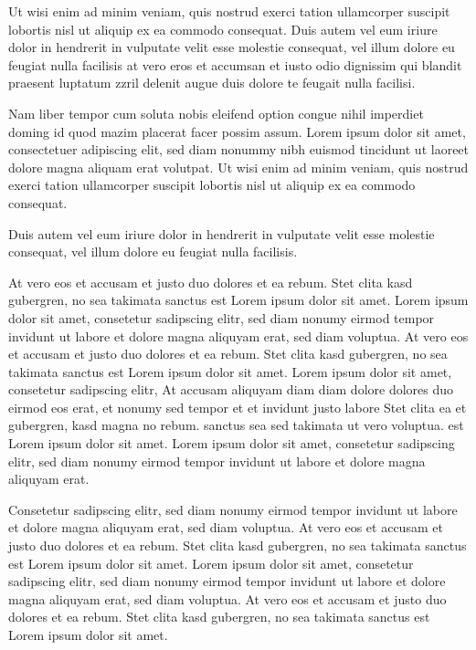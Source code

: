 \documentclass[a4paper]{article}
\begin{document}
Ut wisi enim ad minim veniam, quis nostrud exerci tation ullamcorper suscipit
lobortis nisl ut aliquip ex ea commodo consequat. Duis autem vel eum iriure
dolor in hendrerit in vulputate velit esse molestie consequat, vel illum dolore
eu feugiat nulla facilisis at vero eros et accumsan et iusto odio dignissim qui
blandit praesent luptatum zzril delenit augue duis dolore te feugait nulla
facilisi.

Nam liber tempor cum soluta nobis eleifend option congue nihil imperdiet doming
id quod mazim placerat facer possim assum. Lorem ipsum dolor sit amet,
consectetuer adipiscing elit, sed diam nonummy nibh euismod tincidunt ut
laoreet dolore magna aliquam erat volutpat. Ut wisi enim ad minim veniam, quis
nostrud exerci tation ullamcorper suscipit lobortis nisl ut aliquip ex ea
commodo consequat.

Duis autem vel eum iriure dolor in hendrerit in vulputate velit esse molestie
consequat, vel illum dolore eu feugiat nulla facilisis.

At vero eos et accusam et justo duo dolores et ea rebum. Stet clita kasd
gubergren, no sea takimata sanctus est Lorem ipsum dolor sit amet. Lorem ipsum
dolor sit amet, consetetur sadipscing elitr, sed diam nonumy eirmod tempor
invidunt ut labore et dolore magna aliquyam erat, sed diam voluptua. At vero
eos et accusam et justo duo dolores et ea rebum. Stet clita kasd gubergren, no
sea takimata sanctus est Lorem ipsum dolor sit amet. Lorem ipsum dolor sit amet,
consetetur sadipscing elitr, At accusam aliquyam diam diam dolore dolores duo
eirmod eos erat, et nonumy sed tempor et et invidunt justo labore Stet clita ea
et gubergren, kasd magna no rebum. sanctus sea sed takimata ut vero voluptua.
est Lorem ipsum dolor sit amet. Lorem ipsum dolor sit amet, consetetur
sadipscing elitr, sed diam nonumy eirmod tempor invidunt ut labore et dolore
magna aliquyam erat.

Consetetur sadipscing elitr, sed diam nonumy eirmod tempor invidunt ut labore
et dolore magna aliquyam erat, sed diam voluptua. At vero eos et accusam et
justo duo dolores et ea rebum. Stet clita kasd gubergren, no sea takimata
sanctus est Lorem ipsum dolor sit amet. Lorem ipsum dolor sit amet, consetetur
sadipscing elitr, sed diam nonumy eirmod tempor invidunt ut labore et dolore
magna aliquyam erat, sed diam voluptua. At vero eos et accusam et justo duo
dolores et ea rebum. Stet clita kasd gubergren, no sea takimata sanctus est
Lorem ipsum dolor sit amet.
\end{document}
